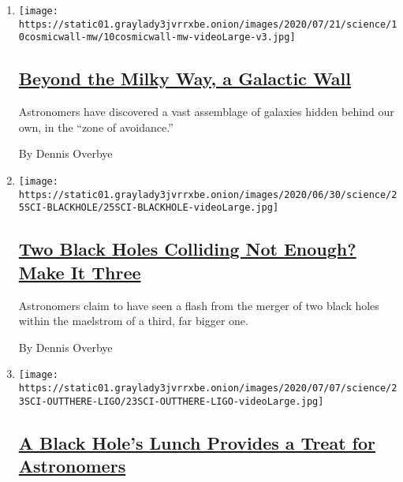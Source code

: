 \begin{enumerate}
\def\labelenumi{\arabic{enumi}.}
\item
  \texttt{[image: https://static01.graylady3jvrrxbe.onion/images/2020/07/21/science/10cosmicwall-mw/10cosmicwall-mw-videoLarge-v3.jpg]}

  \hypertarget{beyond-the-milky-way-a-galactic-wall}{%
  \subsection{\texorpdfstring{\href{/2020/07/10/science/astronomy-galaxies-attractor-universe.html}{Beyond
  the Milky Way, a Galactic
  Wall}}{Beyond the Milky Way, a Galactic Wall}}\label{beyond-the-milky-way-a-galactic-wall}}

  Astronomers have discovered a vast assemblage of galaxies hidden
  behind our own, in the ``zone of avoidance.''

  By Dennis Overbye
\item
  \texttt{[image: https://static01.graylady3jvrrxbe.onion/images/2020/06/30/science/25SCI-BLACKHOLE/25SCI-BLACKHOLE-videoLarge.jpg]}

  \hypertarget{two-black-holes-colliding-not-enough-make-it-three}{%
  \subsection{\texorpdfstring{\href{/2020/06/25/science/black-hole-collision-ligo.html}{Two
  Black Holes Colliding Not Enough? Make It
  Three}}{Two Black Holes Colliding Not Enough? Make It Three}}\label{two-black-holes-colliding-not-enough-make-it-three}}

  Astronomers claim to have seen a flash from the merger of two black
  holes within the maelstrom of a third, far bigger one.

  By Dennis Overbye
\item
  \texttt{[image: https://static01.graylady3jvrrxbe.onion/images/2020/07/07/science/23SCI-OUTTHERE-LIGO/23SCI-OUTTHERE-LIGO-videoLarge.jpg]}

  \hypertarget{a-black-holes-lunch-provides-a-treat-for-astronomers}{%
  \subsection{\texorpdfstring{\href{/2020/06/24/science/black-hole-ligo-gravitational.html}{A
  Black Hole's Lunch Provides a Treat for
  Astronomers}}{A Black Hole's Lunch Provides a Treat for Astronomers}}\label{a-black-holes-lunch-provides-a-treat-for-astronomers}}


\end{enumerate}
